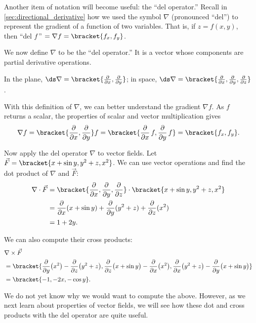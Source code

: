 Another item of notation will become useful: the ``del operator.'' Recall in \autoref{sec:directional_derivative} how we used the symbol $\nabla$ (pronounced ``del'') to represent the gradient of a function of two variables. That is, if $z = f(x,y)$, then ``del $f$\,'' $= \nabla f =\bracket{f_x, f_y}$. 

We now define $\nabla$ to be the ``del operator.'' It is a vector whose components are partial derivative operations. 

In the plane, $\ds\nabla =\bracket{\frac{\partial}{\partial x}, \frac{\partial}{\partial y}}$; in space, $\ds\nabla =\bracket{\frac{\partial}{\partial x}, \frac{\partial}{\partial y},\frac{\partial}{\partial z}}$. 

With this definition of $\nabla$, we can better understand the gradient $\nabla f$. As $f$ returns a scalar, the properties of scalar and vector multiplication gives
\[
\nabla f
=\bracket{\frac{\partial}{\partial x}, \frac{\partial}{\partial y}}f
=\bracket{\frac{\partial}{\partial x}\,f, \frac{\partial}{\partial y}\,f}
=\bracket{f_x, f_y}.
\]

Now apply the del operator $\nabla$ to vector fields. Let $\vec F =\bracket{x+\sin y,y^2+z,x^2}$. We can use vector operations and find the dot product of $\nabla$ and $\vec F$:
\begin{align*}
	\nabla \cdot \vec F
	&=\bracket{\frac{\partial}{\partial x}, \frac{\partial}{\partial y},\frac{\partial}{\partial z}}\cdot \bracket{x+\sin y,y^2+z,x^2}\\
	&= \frac{\partial}{\partial x}(x+\sin y)+ \frac{\partial}{\partial y}(y^2+z) + \frac{\partial}{\partial z}(x^2) \\
	&=1+2y.
\end{align*}

We can also compute their cross products:\small
\begin{align*}
	&\nabla\times \vec F\\
	&= {\bracket{\frac{\partial}{\partial y}\big(x^2\big)-\frac{\partial}{\partial z}\big(y^2+z\big),\frac{\partial}{\partial z}\big(x+\sin y\big)-\frac{\partial}{\partial x}\big(x^2\big),\frac{\partial}{\partial x}\big(y^2+z\big)-\frac{\partial}{\partial y}\big(x+\sin y\big)}}\\
	&=\bracket{-1,-2x,-\cos y}.
\end{align*}\normalsize

We do not yet know why we would want to compute the above. However, as we next learn about properties of vector fields, we will see how these dot and cross products with the del operator are quite useful.


